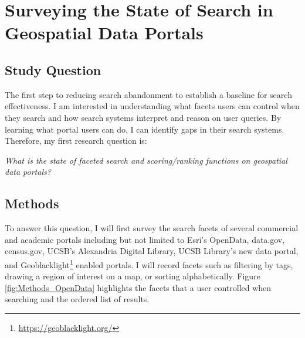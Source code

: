 \section{Surveying the State of Search in Geospatial Data Portals}

\subsection{Study Question}

The first step to reducing search abandonment to establish a baseline for search effectiveness. I am interested in understanding what facets users can control when they search and how search systems interpret and reason on user queries. By learning what portal users can do, I can identify gaps in their search systems. Therefore, my first research question is:
\linebreak

\emph{What is the state of faceted search and scoring/ranking functions on geospatial data portals?}

\subsection{Methods}

To answer this question, I will first survey the search facets of several commercial and academic portals including but not limited to Esri's OpenData, data.gov, census.gov, UCSB's Alexandria Digital Library, UCSB Library's new data portal, and Geoblacklight\footnote{\url{https://geoblacklight.org/}} enabled portals. I will record facets such as filtering by tags, drawing a region of interest on a map, or sorting alphabetically. Figure \ref{fig:Methods_OpenData} highlights the facets that a user controlled when searching and the ordered list of results.

